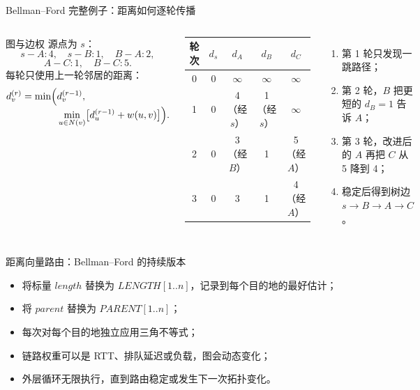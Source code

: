 \documentclass[UTF8,fontset=none,aspectratio=169,10pt]{beamer}
\begin{document}
{\begin{frame}{Bellman--Ford 完整例子：距离如何逐轮传播}
\small
\begin{columns}[T,onlytextwidth]
\begin{block}{图与边权}
源点为 $s$：
\[
s\! -\! A:4,\quad s\! -\! B:1,\quad
B\! -\! A:2,
\]
\[
A\! -\! C:1,\quad B\! -\! C:5.
\]
每轮只使用上一轮邻居的距离：
\[
\begin{aligned}
d_v^{(r)}=\min\Bigl(&d_v^{(r-1)},\\[-1mm]
&\min_{u\in N(v)}\bigl[d_u^{(r-1)}+w(u,v)\bigr]\Bigr).
\end{aligned}
\]
\end{block}
\begin{center}
\begin{tabular}{c|cccc}
\toprule
轮次 & $d_s$ & $d_A$ & $d_B$ & $d_C$ \\
\midrule
0 & 0 & $\infty$ & $\infty$ & $\infty$ \\
1 & 0 & 4（经 $s$） & 1（经 $s$） & $\infty$ \\
2 & 0 & 3（经 $B$） & 1 & 5（经 $A$） \\
3 & 0 & 3 & 1 & 4（经 $A$） \\
\bottomrule
\end{tabular}
\end{center}
\begin{enumerate}
  \item 第 1 轮只发现一跳路径；
  \item 第 2 轮，$B$ 把更短的 $d_B=1$ 告诉 $A$；
  \item 第 3 轮，改进后的 $A$ 再把 $C$ 从 5 降到 4；
  \item 稳定后得到树边 $s\!\to B\!\to A\!\to C$。
\end{enumerate}
\end{columns}
\end{frame}

\begin{frame}{距离向量路由：Bellman--Ford 的持续版本}
\begin{itemize}
  \item 将标量 $length$ 替换为 $LENGTH[1..n]$，记录到每个目的地的最好估计；
  \item 将 $parent$ 替换为 $PARENT[1..n]$；
  \item 每次对每个目的地独立应用三角不等式；
  \item 链路权重可以是 RTT、排队延迟或负载，图会动态变化；
  \item 外层循环无限执行，直到路由稳定或发生下一次拓扑变化。
\end{itemize}
\vfill
{}
\end{frame}

}
\end{document}
